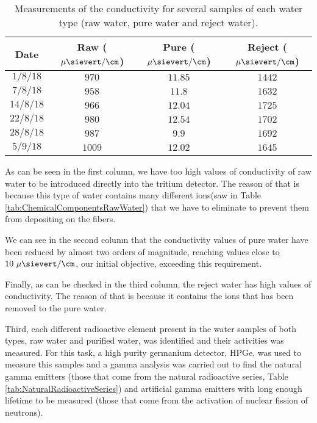 \begin{table}[htbp]
\begin{center}
\begin{tabular}{|c|c|c|c|}
\hline
Date & Raw ($\mu\sievert/\cm$) & Pure ($\mu\sievert/\cm$) & Reject ($\mu\sievert/\cm$) \\
\hline \hline \hline
$1/8/18$ & $970$ & $11.85$ & $1442$ \\ \hline
$7/8/18$ & $958$ & $11.8$ & $1632$ \\ \hline
$14/8/18$ & $966$ & $12.04$ & $1725$ \\ \hline
$22/8/18$ & $980$ & $12.54$ & $1702$ \\ \hline
$28/8/18$ & $987$ & $9.9$ & $1692$ \\ \hline
$5/9/18$ & $1009$ & $12.02$ & $1645$ \\ \hline
\end{tabular}
\caption{Measurements of the conductivity for several samples of each water type (raw water, pure water and reject water).}
\label{tab:ConductivityValues}
\end{center}
\end{table}	

As can be seen in the first column, we have too high values of conductivity of raw water to be introduced directly into the tritium detector. The reason of that is because this type of water contains many different ions(saw in Table \ref{tab:ChemicalComponentsRawWater}) that we have to eliminate to prevent them from depositing on the fibers. 

We can see in the second column that the conductivity values of pure water have been reduced by almost two orders of magnitude, reaching values close to $10~\mu\sievert/\cm$, our initial objective, exceeding this requirement.

Finally, as can be checked in the third column, the reject water has high values of conductivity. The reason of that is because it contains the ions that has been removed to the pure water.

Third, each different radioactive element present in the water samples of both types, raw water and purified water, was identified and their activities was measured. For this task, a high purity germanium detector, HPGe, was used to measure this samples and a gamma analysis was carried out to find the natural gamma emitters (those that come from the natural radioactive series, Table \ref{tab:NaturalRadioactiveSeries}) and artificial gamma emitters with long enough lifetime to be measured (those that come from the activation of nuclear fission of neutrons).

